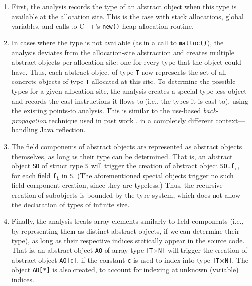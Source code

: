 \documentclass{llncs}
\newcommand{\code}[1]{\texttt{#1}}
\begin{document}
\begin{enumerate}
\setlength\itemsep{0.5em}
\item First, the analysis records the type of an abstract object when this type is
  available at the allocation site. This is the case with stack
  allocations, global variables, and calls to C++'s \code{new()}
  heap allocation routine.
\item In cases where the type is not available (as in a call to
  \code{malloc()}), the analysis deviates from the allocation-site
  abstraction and creates multiple abstract objects per allocation
  site: one for every type that the object could have. Thus, each
  abstract object of type \code{T} now represents the set of all
  concrete objects of type \code{T} allocated at this site. To
  determine the possible types for a given allocation site, the
  analysis creates a special type-less object and records the cast
  instructions it flows to (i.e., the types it is cast to), using the
  existing points-to analysis. This is similar to the use-based
  \emph{back-propagation} technique used in past work
  \cite{ecoop/LiTSX14,aplas/LivshitsWL05,aplas/SmaragdakisBKB15}, in a
  completely different context---handling Java reflection.
\item The field components of abstract objects are represented as
  abstract objects themselves, as long as their type can be
  determined. That is, an abstract object \code{SO} of struct type
  \code{S} will trigger the creation of abstract object
  \code{SO.f$_\code{i}$}, for each field \code{f$_\code{i}$} in
  \code{S}. (The aforementioned special objects trigger no such field
  component creation, since they are typeless.)
  Thus, the recursive creation of subobjects is bounded by the type
  system, which does not allow the declaration of types of infinite
  size.
\item Finally, the analysis treats array elements similarly to
  field components (i.e., by representing them as distinct abstract
  objects, if we can determine their type), as long as their respective
  indices statically appear in the source code. That is, an abstract
  object \code{AO} of array type \code{[T$\times$N]} will trigger the
  creation of abstract object \code{AO[c]}, if the constant \code{c}
  is used to index into type \code{[T$\times$N]}. The object
  \code{AO[*]} is also created, to account for indexing at unknown
  (variable) indices.
\end{enumerate}
\end{document}
